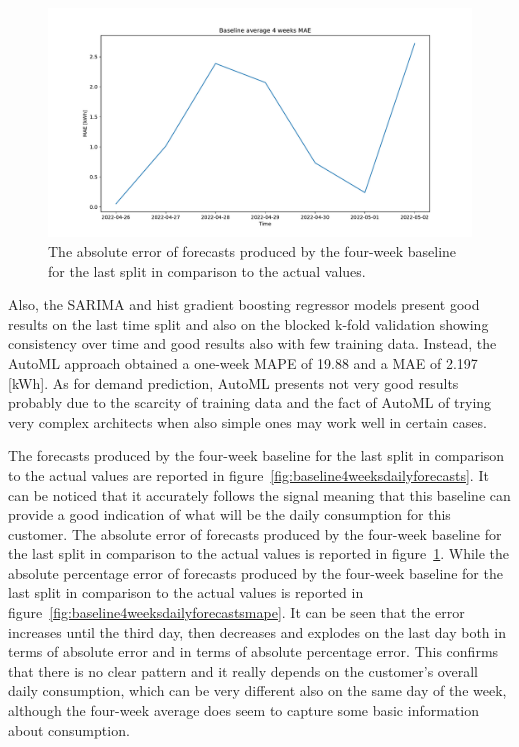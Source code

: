 \begin{figure}[H]
\centering
\includegraphics[width=1\textwidth]{images/baseline/baseline_average_4_weeks_daily_aggregated_mae}
\caption{The absolute error of forecasts produced by the four-week baseline for the last split in comparison to the actual values.}
\label{fig:baseline4weeksdailyforecastsmae}
\end{figure}

Also, the SARIMA and hist gradient boosting regressor models present good results on the last time split and also on the blocked k-fold validation showing consistency over time and good results also with few training data.
Instead, the AutoML approach obtained a one-week MAPE of 19.88 and a MAE of 2.197 [kWh].
As for demand prediction, AutoML presents not very good results probably due to the scarcity of training data and the fact of AutoML of trying very complex architects when also simple ones may work well in certain cases.

The forecasts produced by the four-week baseline for the last split in comparison to the actual values are reported in figure~\ref{fig:baseline4weeksdailyforecasts}.
It can be noticed that it accurately follows the signal meaning that this baseline can provide a good indication of what will be the daily consumption for this customer.
The absolute error of forecasts produced by the four-week baseline for the last split in comparison to the actual values is reported in figure~\ref{fig:baseline4weeksdailyforecastsmae}.
While the absolute percentage error of forecasts produced by the four-week baseline for the last split in comparison to the actual values is reported in figure~\ref{fig:baseline4weeksdailyforecastsmape}.
It can be seen that the error increases until the third day, then decreases and explodes on the last day both in terms of absolute error and in terms of absolute percentage error.
This confirms that there is no clear pattern and it really depends on the customer's overall daily consumption, which can be very different also on the same day of the week, although the four-week average does seem to capture some basic information about consumption.


